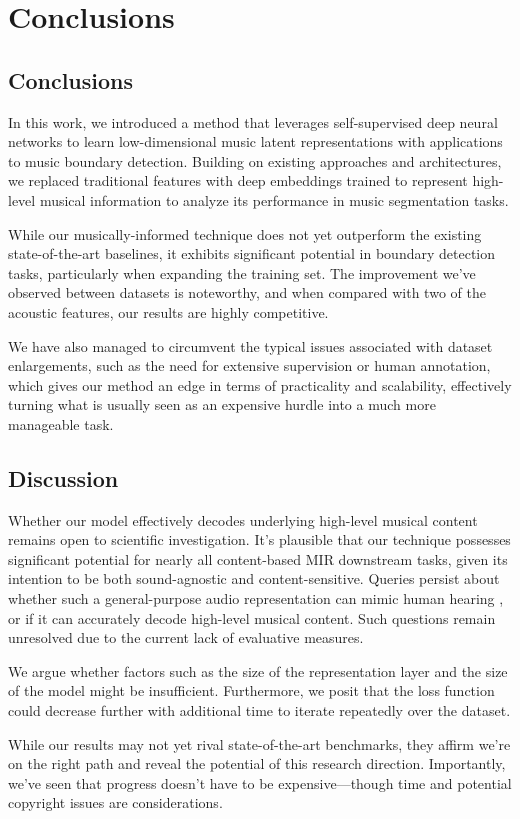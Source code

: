 \chapter{Conclusions}

\section{Conclusions}

In this work, we introduced a method that leverages self-supervised deep neural networks to learn low-dimensional music latent representations with applications to music boundary detection. Building on existing approaches and architectures, we replaced traditional features with deep embeddings trained to represent high-level musical information to analyze its performance in music segmentation tasks.

While our musically-informed technique does not yet outperform the existing state-of-the-art baselines, it exhibits significant potential in boundary detection tasks, particularly when expanding the training set. The improvement we've observed between datasets is noteworthy, and when compared with two of the acoustic features, our results are highly competitive. 

We have also managed to circumvent the typical issues associated with dataset enlargements, such as the need for extensive supervision or human annotation, which gives our method an edge in terms of practicality and scalability, effectively turning what is usually seen as an expensive hurdle into a much more manageable task.

\section{Discussion}

Whether our model effectively decodes underlying high-level musical content remains open to scientific investigation. It's plausible that our technique possesses significant potential for nearly all content-based MIR downstream tasks, given its intention to be both sound-agnostic and content-sensitive. Queries persist about whether such a general-purpose audio representation can mimic human hearing \cite{Li2023MERT:Training, Turian2022HEAR:Representations}, or if it can accurately decode high-level musical content. Such questions remain unresolved due to the current lack of evaluative measures. 

We argue whether factors such as the size of the representation layer and the size of the model \cite{verydeep} might be insufficient. Furthermore, we posit that the loss function could decrease further with additional time to iterate repeatedly over the dataset.

While our results may not yet rival state-of-the-art benchmarks, they affirm we're on the right path and reveal the potential of this research direction. Importantly, we've seen that progress doesn't have to be expensive—though time and potential copyright issues are considerations.

\newpage


